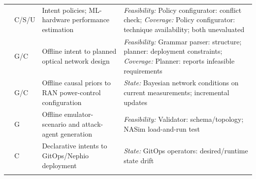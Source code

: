 \begin{longtable}{>{\raggedright\arraybackslash}p{.09\soklitwidth}>{\centering\arraybackslash}p{.07\soklitwidth}>{\raggedright\arraybackslash}p{.36\soklitwidth}>{\raggedright\arraybackslash}p{.48\soklitwidth}}
\addlinespace[1pt]
\cite{e0arxiv211107724} & C/S/U & Intent policies; ML-hardware performance estimation & \emph{Feasibility:} Policy configurator: conflict check; \emph{Coverage:} Policy configurator: technique availability; both unevaluated \\
\addlinespace[1pt]
\cite{e0arxiv250922834} & G/C & Offline intent to planned optical network design & \emph{Feasibility:} Grammar parser: structure; planner: deployment constraints; \emph{Coverage:} Planner: reports infeasible requirements \\
\addlinespace[1pt]
\cite{e0arxiv260427084} & G/C & Offline causal priors to RAN power-control configuration & \emph{State:} Bayesian network conditions on current measurements; incremental updates \\
\addlinespace[1pt]
\cite{e0arxiv260816422} & G & Offline emulator-scenario and attack-agent generation & \emph{Feasibility:} Validator: schema/topology; NASim load-and-run test \\
\addlinespace[1pt]
\cite{e0arxiv250913901} & C & Declarative intents to GitOps/Nephio deployment & \emph{State:} GitOps operators: desired/runtime state drift \\
\addlinespace[1pt]
\end{longtable}
\endgroup
